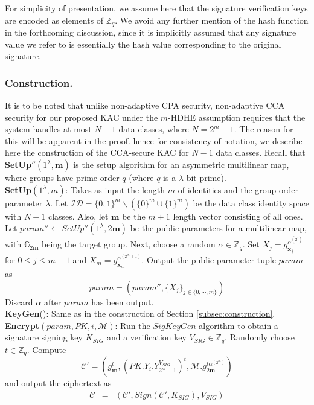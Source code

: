 For simplicity of presentation, we assume here that the signature verification keys are encoded as elements of $\mathbb{Z}_q$. We avoid any further mention of the hash function in the forthcoming discussion, since it is implicitly assumed that any signature value we refer to is essentially the hash value corresponding to the original signature.

\subsubsection{Construction.}  It is to be noted that unlike non-adaptive CPA security, non-adaptive CCA security for our proposed KAC under the $m$-HDHE assumption requires that the system handles at most $N-1$ data classes, where $N=2^m-1$. The reason for this will be apparent in the proof. hence for consistency of notation, we describe here the construction of the CCA-secure KAC for $N-1$ data classes. Recall that \textbf{SetUp}$''(1^{\lambda},\mathbf{m})$ is the setup algorithm for an asymmetric multilinear map, where groups have prime order $q$ (where $q$ is a $\lambda$ bit prime).\\

\noindent\textbf{SetUp}$(1^{\lambda},m)$: Takes as input the length $m$ of identities and the group order parameter $\lambda$. Let $\mathcal{ID}=\{0,1\}^m\backslash(\{0\}^m\cup\{1\}^m)$ be the data class identity space with $N-1$ classes. Also, let $\mathbf{m}$ be the $m+1$ length vector consisting of all ones. Let $param''\leftarrow SetUp''(1^{\lambda},2\mathbf{m})$ be the public parameters for a multilinear map, with $\mathbb{G}_{2\mathbf{m}}$ being the target group. Next, choose a random $\alpha\in \mathbb{Z}_q$. Set $X_j=g^{\alpha^{(2^j)}}_{\mathbf{x}_j}$ for $0\leq j\leq m-1$ and $X_m=g^{\alpha^{(2^m+1)}}_{\mathbf{x}_m}$. Output the public parameter tuple $param$ as
\begin{equation}
 param = (param'',\{X_j\}_{j\in\{0,\cdots,m\}})\nonumber
\end{equation}
\noindent Discard $\alpha$ after $param$ has been output.\\ 
 
\noindent \textbf{KeyGen}(): Same as in the construction of Section \ref{subsec:construction}.\\
 
\noindent \textbf{Encrypt}$(param,PK,i,\mathcal{M})$: Run the $SigKeyGen$ algorithm to obtain a signature signing key $K_{SIG}$ and a verification key $V_{SIG} \in \mathbb{Z}_q$. Randomly choose $t\in\mathbb{Z}_q$. Compute 
\begin{equation}
 \mathcal{C}'=(g^{t}_{\mathbf{m}},(PK.Y_i.Y^{V_{SIG}}_{2^m-1})^{t},\mathcal{M}.g^{t\alpha^{(2^m)}}_{2\mathbf{m}})\nonumber
\end{equation} 
\noindent and output the ciphertext as
\begin{eqnarray}
 \mathcal{C}&=&(\mathcal{C}',Sign(\mathcal{C}',K_{SIG}),V_{SIG}) \nonumber
\end{eqnarray} 
 
